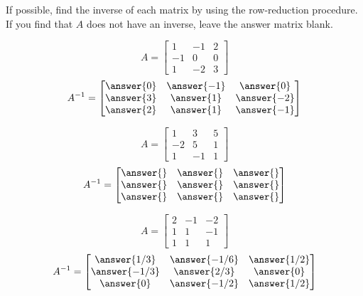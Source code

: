\documentclass{ximera}
\begin{document}
\begin{problem}
If possible, find the inverse of each matrix by using the row-reduction procedure.  If you find that $A$ does not have an inverse, leave the answer matrix blank.
  \begin{problem}
  $$A=\begin{bmatrix}1&-1&2\\-1&0&0\\1&-2&3\end{bmatrix}$$
  $$A^{-1}=\begin{bmatrix}\answer{0} & \answer{-1} & \answer{0} \\ \answer{3} & \answer{1} & \answer{-2}\\ \answer{2} & \answer{1} & \answer{-1}\end{bmatrix}$$
  
 
 \begin{multipleChoice}
\end{multipleChoice}
  \end{problem}
  

  \begin{problem}
  $$A=\begin{bmatrix}1&3&5\\-2&5&1\\1&-1&1\end{bmatrix}$$
  $$A^{-1}=\begin{bmatrix}\answer{} &\answer{}&\answer{}\\\answer{}&\answer{}&\answer{}\\\answer{}&\answer{}&\answer{}\end{bmatrix}$$
  
 
 \begin{multipleChoice}
\end{multipleChoice}
  \end{problem}  
  
\begin{problem}
  $$A=\begin{bmatrix}2&-1&-2\\1&1&-1\\1&1&1\end{bmatrix}$$
  $$A^{-1}=\begin{bmatrix}\answer{1/3} & \answer{-1/6} & \answer{1/2} \\  \answer{-1/3} & \answer{2/3} & \answer{0}\\\answer{0} & \answer{-1/2} & \answer{1/2}\end{bmatrix}$$
  
 
 
 \begin{multipleChoice}
\end{multipleChoice}
  \end{problem}   
  
\end{problem}
\end{document}
